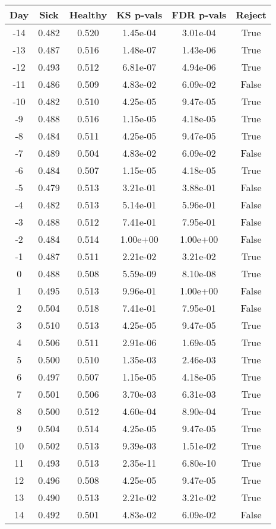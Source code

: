 \begin{tabular}{c|c|c|c|c|c}
Day &  Sick & Healthy &  KS p-vals & FDR p-vals & Reject\\
\hline
-14 & 0.482 &   0.520 &   1.45e-04 &   3.01e-04 &   True\\
-13 & 0.487 &   0.516 &   1.48e-07 &   1.43e-06 &   True\\
-12 & 0.493 &   0.512 &   6.81e-07 &   4.94e-06 &   True\\
-11 & 0.486 &   0.509 &   4.83e-02 &   6.09e-02 &  False\\
-10 & 0.482 &   0.510 &   4.25e-05 &   9.47e-05 &   True\\
 -9 & 0.488 &   0.516 &   1.15e-05 &   4.18e-05 &   True\\
 -8 & 0.484 &   0.511 &   4.25e-05 &   9.47e-05 &   True\\
 -7 & 0.489 &   0.504 &   4.83e-02 &   6.09e-02 &  False\\
 -6 & 0.484 &   0.507 &   1.15e-05 &   4.18e-05 &   True\\
 -5 & 0.479 &   0.513 &   3.21e-01 &   3.88e-01 &  False\\
 -4 & 0.482 &   0.513 &   5.14e-01 &   5.96e-01 &  False\\
 -3 & 0.488 &   0.512 &   7.41e-01 &   7.95e-01 &  False\\
 -2 & 0.484 &   0.514 &   1.00e+00 &   1.00e+00 &  False\\
 -1 & 0.487 &   0.511 &   2.21e-02 &   3.21e-02 &   True\\
  0 & 0.488 &   0.508 &   5.59e-09 &   8.10e-08 &   True\\
  1 & 0.495 &   0.513 &   9.96e-01 &   1.00e+00 &  False\\
  2 & 0.504 &   0.518 &   7.41e-01 &   7.95e-01 &  False\\
  3 & 0.510 &   0.513 &   4.25e-05 &   9.47e-05 &   True\\
  4 & 0.506 &   0.511 &   2.91e-06 &   1.69e-05 &   True\\
  5 & 0.500 &   0.510 &   1.35e-03 &   2.46e-03 &   True\\
  6 & 0.497 &   0.507 &   1.15e-05 &   4.18e-05 &   True\\
  7 & 0.501 &   0.506 &   3.70e-03 &   6.31e-03 &   True\\
  8 & 0.500 &   0.512 &   4.60e-04 &   8.90e-04 &   True\\
  9 & 0.504 &   0.514 &   4.25e-05 &   9.47e-05 &   True\\
 10 & 0.502 &   0.513 &   9.39e-03 &   1.51e-02 &   True\\
 11 & 0.493 &   0.513 &   2.35e-11 &   6.80e-10 &   True\\
 12 & 0.496 &   0.508 &   4.25e-05 &   9.47e-05 &   True\\
 13 & 0.490 &   0.513 &   2.21e-02 &   3.21e-02 &   True\\
 14 & 0.492 &   0.501 &   4.83e-02 &   6.09e-02 &  False\\
\end{tabular}